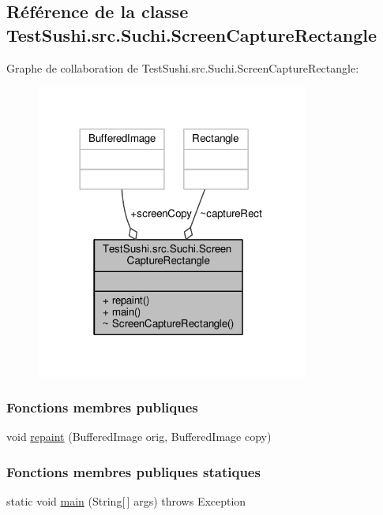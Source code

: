 \hypertarget{classTestSushi_1_1src_1_1Suchi_1_1ScreenCaptureRectangle}{}\subsection{Référence de la classe Test\+Sushi.\+src.\+Suchi.\+Screen\+Capture\+Rectangle}
\label{classTestSushi_1_1src_1_1Suchi_1_1ScreenCaptureRectangle}


Graphe de collaboration de Test\+Sushi.\+src.\+Suchi.\+Screen\+Capture\+Rectangle\+:\nopagebreak
\begin{figure}[H]
\begin{center}
\leavevmode
\includegraphics[width=254pt]{classTestSushi_1_1src_1_1Suchi_1_1ScreenCaptureRectangle__coll__graph}
\end{center}
\end{figure}
\subsubsection*{Fonctions membres publiques}
\begin{DoxyCompactItemize}
\item 
void \hyperlink{classTestSushi_1_1src_1_1Suchi_1_1ScreenCaptureRectangle_a633f798a5bf29e80d0fd242bb2e2fd0c}{repaint} (Buffered\+Image orig, Buffered\+Image copy)
\end{DoxyCompactItemize}
\subsubsection*{Fonctions membres publiques statiques}
\begin{DoxyCompactItemize}
\item 
static void \hyperlink{classTestSushi_1_1src_1_1Suchi_1_1ScreenCaptureRectangle_afd64a5301474ebe47d6a477b6c426921}{main} (String\mbox{[}$\,$\mbox{]} args)  throws Exception 
\end{DoxyCompactItemize}
